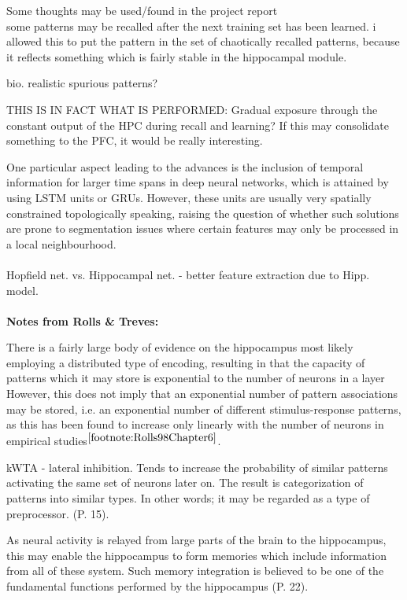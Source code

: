 Some thoughts may be used/found in the project report
\\
some patterns may be recalled after the next training set has been learned. i allowed this to put the pattern in the set of chaotically recalled patterns, because it reflects something which is fairly stable in the hippocampal module.

bio. realistic spurious patterns?

THIS IS IN FACT WHAT IS PERFORMED: Gradual exposure through the constant output of the HPC during recall and learning? If this may consolidate something to the PFC, it would be really interesting.

One particular aspect leading to the advances is the inclusion of temporal information for larger time spans in deep neural networks, which is attained by using LSTM units or GRUs. However, these units are usually very spatially constrained topologically speaking, raising the question of whether such solutions are prone to segmentation issues where certain features may only be processed in a local neighbourhood.
\\\\

Hopfield net. vs. Hippocampal net. - better feature extraction due to Hipp. model.
\\\\

\textbf{Notes from Rolls \& Treves:}

There is a fairly large body of evidence on the hippocampus most likely employing a distributed type of encoding, resulting in that the capacity of patterns which it may store is exponential to the number of neurons in a layer
However, this does not imply that an exponential number of pattern associations may be stored, i.e. an exponential number of different stimulus-response patterns, as this has been found to increase only linearly with the number of neurons in empirical studies$^{\ref{footnote:Rolls98Chapter6}}$.

kWTA - lateral inhibition. Tends to increase the probability of similar patterns activating the same set of neurons later on. The result is categorization of patterns into similar types. In other words; it may be regarded as a type of preprocessor. (P. 15).

As neural activity is relayed from large parts of the brain to the hippocampus, this may enable the hippocampus to form memories which include information from all of these system. Such memory integration is believed to be one of the fundamental functions performed by the hippocampus (P. 22).

